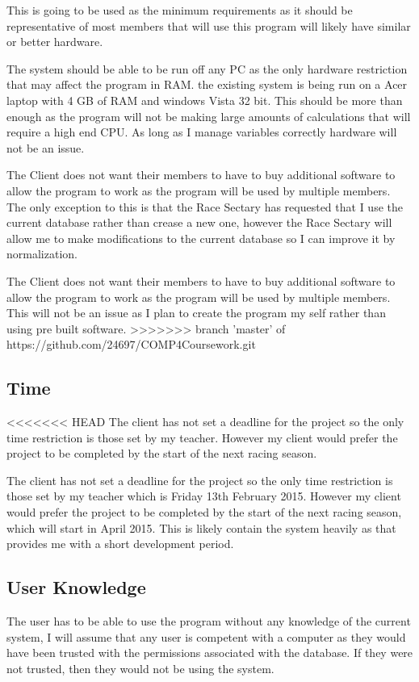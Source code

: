 This is going to be used as the minimum requirements as it should be representative of most members that will use this program will likely have similar or better hardware.

The system should be able to be run off any PC as the only hardware restriction that may affect the program in RAM. the existing system is being run on a Acer laptop with 4 GB of RAM and windows Vista 32 bit. This should be more than enough as the program will not be making large amounts of calculations that will require a high end CPU. As long as I manage variables correctly hardware will not be an issue.


The Client does not want their members to have to buy additional software to allow the program to work as the program will be used by multiple members. The only exception to this is that the Race Sectary has requested that I use the current database rather than crease a new one, however the Race Sectary will allow me to make modifications to the current database so I can improve it by normalization.

The Client does not want their members to have to buy additional software to allow the program to work as the program will be used by multiple members. This will not be an issue as I plan to create the program my self rather than using pre built software.
>>>>>>> branch 'master' of https://github.com/24697/COMP4Coursework.git
\subsection{Time}
<<<<<<< HEAD
The client has not set a deadline for the project so the only time restriction is those set by my teacher. However my client would prefer the project to be completed by the start of the next racing season.

The client has not set a deadline for the project so the only time restriction is those set by my teacher which is Friday 13th February 2015. However my client would prefer the project to be completed by the start of the next racing season, which will start in April 2015. This is likely contain the system heavily as that provides me with a short development period.

\subsection{User Knowledge}

The user has to be able to use the program without any knowledge of the current system, I will assume that any user is competent with a computer as they would have been trusted with the permissions associated with the database. If they were not trusted, then they would not be using the system.

